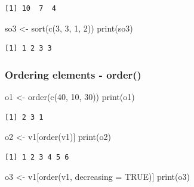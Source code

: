 \documentclass[
  letterpaper,
  DIV=11,
  numbers=noendperiod]{scrartcl}
\newenvironment{Shaded}{\begin{snugshade}}{\end{snugshade}}
\newcommand{\AttributeTok}[1]{\textcolor[rgb]{0.40,0.45,0.13}{#1}}
\newcommand{\ConstantTok}[1]{\textcolor[rgb]{0.56,0.35,0.01}{#1}}
\newcommand{\DecValTok}[1]{\textcolor[rgb]{0.68,0.00,0.00}{#1}}
\newcommand{\FunctionTok}[1]{\textcolor[rgb]{0.28,0.35,0.67}{#1}}
\newcommand{\NormalTok}[1]{\textcolor[rgb]{0.00,0.23,0.31}{#1}}
\newcommand{\OtherTok}[1]{\textcolor[rgb]{0.00,0.23,0.31}{#1}}
\begin{document}
\begin{verbatim}
[1] 10  7  4
\end{verbatim}

\begin{Shaded}
\begin{Highlighting}[]
\NormalTok{so3 }\OtherTok{\textless{}{-}} \FunctionTok{sort}\NormalTok{(}\FunctionTok{c}\NormalTok{(}\DecValTok{3}\NormalTok{, }\DecValTok{3}\NormalTok{, }\DecValTok{1}\NormalTok{, }\DecValTok{2}\NormalTok{))}
\FunctionTok{print}\NormalTok{(so3)}
\end{Highlighting}
\end{Shaded}

\begin{verbatim}
[1] 1 2 3 3
\end{verbatim}

\subsubsection{Ordering elements -
order()}\label{ordering-elements---order}

\begin{Shaded}
\begin{Highlighting}[]
\NormalTok{o1 }\OtherTok{\textless{}{-}} \FunctionTok{order}\NormalTok{(}\FunctionTok{c}\NormalTok{(}\DecValTok{40}\NormalTok{, }\DecValTok{10}\NormalTok{, }\DecValTok{30}\NormalTok{))}
\FunctionTok{print}\NormalTok{(o1)}
\end{Highlighting}
\end{Shaded}

\begin{verbatim}
[1] 2 3 1
\end{verbatim}

\begin{Shaded}
\begin{Highlighting}[]
\NormalTok{o2 }\OtherTok{\textless{}{-}}\NormalTok{ v1[}\FunctionTok{order}\NormalTok{(v1)]}
\FunctionTok{print}\NormalTok{(o2)}
\end{Highlighting}
\end{Shaded}

\begin{verbatim}
[1] 1 2 3 4 5 6
\end{verbatim}

\begin{Shaded}
\begin{Highlighting}[]
\NormalTok{o3 }\OtherTok{\textless{}{-}}\NormalTok{ v1[}\FunctionTok{order}\NormalTok{(v1, }\AttributeTok{decreasing =} \ConstantTok{TRUE}\NormalTok{)]}
\FunctionTok{print}\NormalTok{(o3)}
\end{Highlighting}
\end{Shaded}
\end{document}
